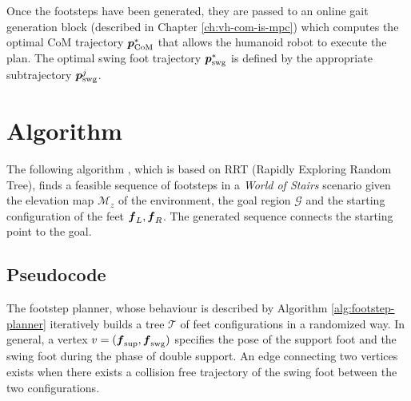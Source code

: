 Once the footsteps have been generated, they are passed to an online gait 
generation block (described in Chapter \ref{ch:vh-com-is-mpc}) which computes
the 
optimal CoM trajectory ${\mbox{\boldmath $p$}}_{\rm CoM}^*$ that allows the humanoid robot to
execute the plan. The optimal swing foot trajectory ${\mbox{\boldmath $p$}}_{\rm {swg}}^*$ is 
defined by the appropriate subtrajectory ${\mbox{\boldmath $p$}}_{\rm {swg}}^j$.


\section{Algorithm}
The following algorithm \cite{ECC19}, which is based on RRT (Rapidly Exploring
Random Tree), finds a feasible sequence of footsteps in a
\textit{World of Stairs} scenario given the elevation map $\mathcal{M}_z$ of the 
environment,
the goal region $\mathcal{G}$ and the starting configuration of the feet
${\mbox{\boldmath $f$}}_L, {\mbox{\boldmath $f$}}_R$. The generated sequence connects the starting point to the
goal.

\subsection{Pseudocode}
The footstep planner, whose behaviour is described by Algorithm
\ref{alg:footstep-planner} iteratively builds a tree $\mathcal{T}$ of feet 
configurations in a randomized way. In general, a vertex $v=({\mbox{\boldmath $f$}}_{\rm {sup}},
{\mbox{\boldmath $f$}}_{\rm {swg}})$ specifies the pose of the support foot and the swing foot 
during the phase of double support. An edge connecting two vertices exists 
when there exists a collision free trajectory of the swing foot between 
the two configurations.

